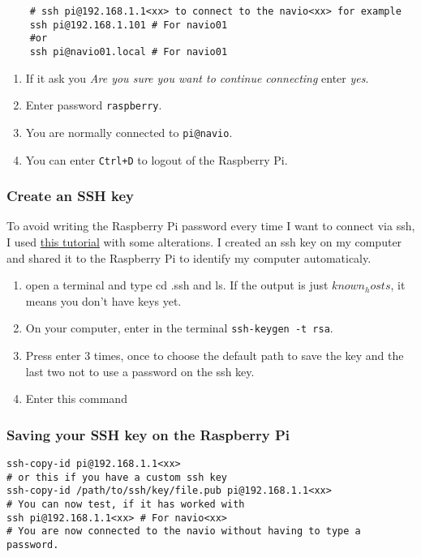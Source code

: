 \begin{verbatim}
    # ssh pi@192.168.1.1<xx> to connect to the navio<xx> for example
    ssh pi@192.168.1.101 # For navio01
    #or
    ssh pi@navio01.local # For navio01

                \end{verbatim}

\begin{enumerate}
    \item If it ask you \emph{Are you sure you want to continue connecting} enter \emph{yes}.
    \item Enter password \texttt{raspberry}.
    \item You are normally connected to \texttt{pi@navio}.
    \item You can enter \texttt{Ctrl+D} to logout of the Raspberry Pi.
\end{enumerate}

\subsubsection{Create an SSH key}
To avoid writing the Raspberry Pi password every time I want to connect via ssh, I used \href{https://www.ssh.com/ssh/copy-id}{this tutorial} with some alterations. I created an ssh key on my computer and shared it to the Raspberry Pi to identify my computer automaticaly.

\begin{enumerate}
    \item open a terminal and type cd .ssh and ls. If the output is just $known_hosts$, it means you don't have keys yet.
    \item On your computer, enter in the terminal \texttt{ssh-keygen -t rsa}.
    \item Press enter 3 times, once to choose the default path to save the key and the last two not to use a password on the ssh key.
    \item Enter this command
\end{enumerate}

\subsubsection{Saving your SSH key on the Raspberry Pi}

\begin{verbatim}
ssh-copy-id pi@192.168.1.1<xx>
# or this if you have a custom ssh key
ssh-copy-id /path/to/ssh/key/file.pub pi@192.168.1.1<xx>
# You can now test, if it has worked with
ssh pi@192.168.1.1<xx> # For navio<xx>
# You are now connected to the navio without having to type a password.
                \end{verbatim}

